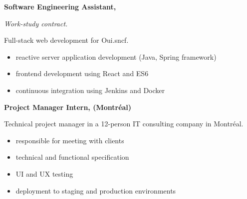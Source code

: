 \documentclass{cv}
\begin{document}
\begin{minipage}[t]{.65\textwidth}
\begin{expbox}[title={dec. 2016, \faicon{clock-o} 3 years}]
	\begin{minipage}[t]{\logoboxwidth}%
	\centering
	\end{minipage}
	\begin{minipage}[t]{0.8\textwidth}

	\textbf{Software Engineering Assistant, \evtech{}}\smallskip

	\textit{Work-study contract.} 

	Full-stack web development for Oui.sncf.

	\begin{itemize}
		\item reactive server application development (Java, Spring framework)
		\item frontend development using React and ES6
		\item continuous integration using Jenkins and Docker
		\end{itemize}
	\end{minipage}

\end{expbox}

\begin{expbox}[title={may 2018, \faicon{clock-o} 4 months}]

	\begin{minipage}[t]{\logoboxwidth}%
	\centering
	\end{minipage}
	\begin{minipage}[t]{0.8\textwidth}

	\textbf{Project Manager Intern, \adfab{} (Montréal)}\smallskip

	Technical project manager in a 12-person IT consulting company in Montréal.

	\begin{itemize}
		\item responsible for meeting with clients
		\item technical and functional specification
		\item UI and UX testing
		\item deployment to staging and production environments
		\end{itemize}
	\end{minipage}

\end{expbox}

\begin{expbox}[title={2016 -- 2019}]

	\begin{minipage}[t]{\logoboxwidth}%
	\centering
	\end{minipage}
	\begin{minipage}[t]{0.8\textwidth}


\end{minipage}
\end{expbox}
\end{minipage}
\end{document}
